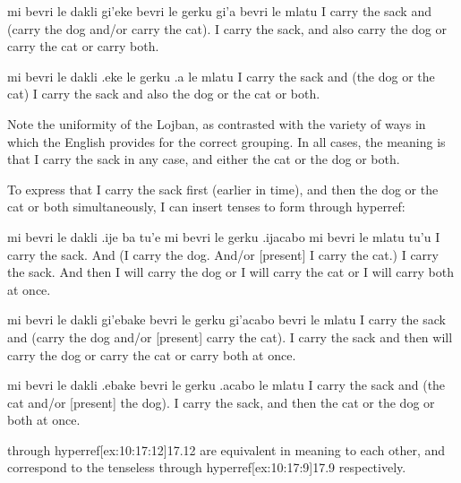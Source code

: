 \begin{example}
mi bevri le dakli\n
\T	gi'eke bevri le gerku gi'a bevri le mlatu\n
I carry the sack\n
\T	and (carry the dog and/or carry the cat).\n
I carry the sack, and also carry the dog\n
\T	or carry the cat or carry both.
\end{example}

\begin{example}
mi bevri le dakli .eke le gerku .a le mlatu\n
I carry the sack and (the dog or the cat)\n
I carry the sack and also the dog or the cat or both.
\end{example}

Note the uniformity of the Lojban, as contrasted with the
    variety of ways in which the English provides for the correct
    grouping. In all cases, the meaning is that I carry the sack in
    any case, and either the cat or the dog or both.

To express that I carry the sack first (earlier in time),
    and then the dog or the cat or both simultaneously, I can
    insert tenses to form 
    through hyperref:
\begin{example}
mi bevri le dakli\n
\T	.ije ba tu'e mi bevri le gerku\n
\T	.ijacabo mi bevri le mlatu tu'u\n
I carry the sack.\n
\T	And  (I carry the dog.\n
\T	And/or [present] I carry the cat.)\n
I carry the sack. And then I will carry the dog\n
\T	or I will carry the cat or I will carry both\n
\T	at once.
\end{example}

\begin{example}
mi bevri le dakli\n
\T	gi'ebake bevri le gerku\n
\T	gi'acabo bevri le mlatu\n
I carry the sack\n
\T	and  (carry the dog\n
\T	and/or [present] carry the cat).\n
I carry the sack and then will carry the dog\n
\T	or carry the cat or carry both at once.
\end{example}

\begin{example}
mi bevri le dakli\n
\T	.ebake bevri le gerku .acabo le mlatu\n
I carry the sack and\n
\T	{} (the cat and/or [present] the dog).\n
I carry the sack, and then the cat or the dog\n
\T	or both at once.
\end{example}

 through hyperref[ex:10:17:12]{17.12} are equivalent in meaning to each
    other, and correspond to the tenseless  through hyperref[ex:10:17:9]{17.9} respectively.



